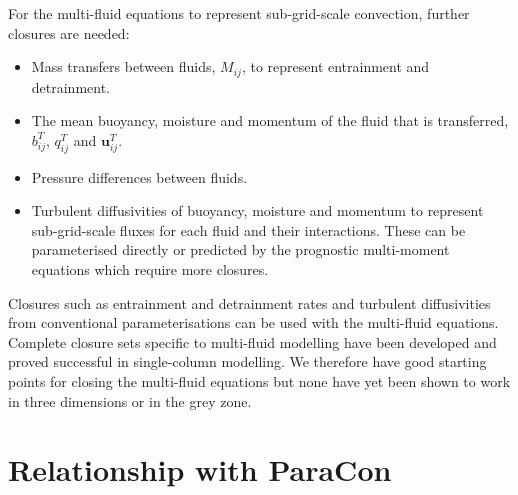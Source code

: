 \documentclass[11pt,a4paper]{article}
\begin{document}
For the multi-fluid equations to represent sub-grid-scale convection, further closures are needed:\hspace{-1in}
\begin{itemize}
\item Mass transfers between fluids, $M_{ij}$, to represent entrainment and detrainment.
\item The mean buoyancy, moisture and momentum of the fluid that is transferred, $b_{ij}^T$, $q_{ij}^T$ and $\mathbf{u}_{ij}^T$. 
\item Pressure differences between fluids.
\item Turbulent diffusivities of buoyancy, moisture and momentum to represent sub-grid-scale fluxes for each fluid and their interactions. These can be parameterised directly or predicted by the prognostic multi-moment equations which require more closures.
\end{itemize}
Closures such as entrainment and detrainment rates and turbulent diffusivities from conventional parameterisations can be used with the multi-fluid equations. Complete closure sets specific to multi-fluid modelling have been developed \cite[]{WMS20,TEB19} and proved successful in single-column modelling. We therefore have good starting points for closing the multi-fluid equations but none have yet been shown to work in three dimensions or in the grey zone. 

\section{Relationship with ParaCon}
\end{document}

